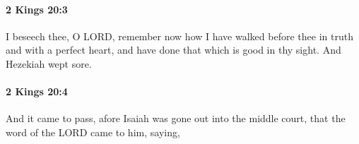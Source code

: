 		\paragraph{2 Kings 20:3} %
			\label{2KINGS-20-3}

			I beseech thee, O LORD, remember now how I have walked before thee in truth and with a perfect heart, and have done that which is good in thy sight. And Hezekiah wept sore.


		\paragraph{2 Kings 20:4} %
			\label{2KINGS-20-4}

			And it came to pass, afore Isaiah was gone out into the middle court, that the word of the LORD came to him, saying,


